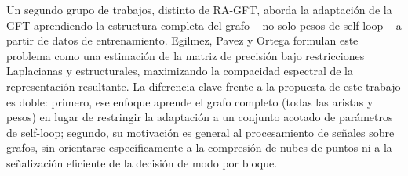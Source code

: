         Un segundo grupo de trabajos, distinto de RA-GFT, aborda la adaptación de la GFT
        aprendiendo la estructura completa del grafo -- no solo pesos de self-loop -- a
        partir de datos de entrenamiento. Egilmez, Pavez y Ortega \cite{egilmez2017graphlearning}
        formulan este problema como una estimación de la matriz de precisión bajo
        restricciones Laplacianas y estructurales, maximizando la compacidad espectral de la
        representación resultante. La diferencia clave frente a la propuesta de este trabajo
        es doble: primero, ese enfoque aprende el grafo completo (todas las aristas y pesos)
        en lugar de restringir la adaptación a un conjunto acotado de parámetros de
        self-loop; segundo, su motivación es general al procesamiento de señales sobre
        grafos, sin orientarse específicamente a la compresión de nubes de puntos ni a la
        señalización eficiente de la decisión de modo por bloque.

